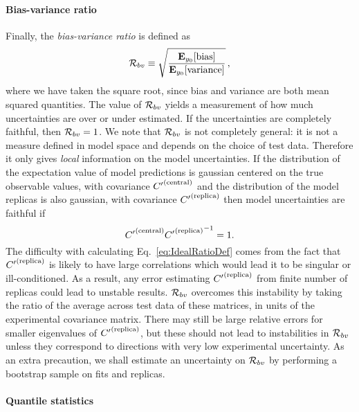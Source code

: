 \paragraph{Bias-variance ratio}

Finally, the {\em bias-variance ratio} is defined as
\begin{equation}
    \label{eq:RatioDef}
    \mathcal{R}_{bv} \equiv \sqrt{\frac{
        \mathbf{E}_{y_0}[ {\rm bias} ]}{
            \mathbf{E}_{y_0}[ {\rm variance} ]}}\, ,
\end{equation}
where we have taken the square root, since bias and variance are both mean
squared quantities. The value of $\mathcal{R}_{bv}$ yields a measurement of how
much uncertainties are over or under estimated. If the uncertainties are
completely faithful, then $\mathcal{R}_{bv} = 1$. We note that $\mathcal{R}_{bv}$ is
not completely general: it is not a measure defined in model space and depends
on the choice of test data. Therefore it only gives {\em local} information on
the model uncertainties. If the distribution of the expectation value of model
predictions is gaussian centered on the true observable values, with covariance
${{C}^{\prime}}^{(\rm central)}$ and the distribution of the model replicas is also gaussian, with
covariance ${{C}^{\prime}}^{(\rm replica)}$ then model uncertainties are faithful if
\begin{equation}\label{eq:IdealRatioDef}
    {{C}^{\prime}}^{(\rm central)} {{{C}^{\prime}}^{(\rm replica)}}^{-1} = 1.
\end{equation}
The difficulty with calculating Eq.~\ref{eq:IdealRatioDef} comes from the fact
that ${{C}^{\prime}}^{(\rm replica)}$ is likely to have large correlations which would lead it to be
singular or ill-conditioned. As a result, any error estimating ${{C}^{\prime}}^{(\rm replica)}$ from
finite number of replicas could lead to unstable results. $\mathcal{R}_{bv}$
overcomes this instability by taking the ratio of the average across test data
of these matrices, in units of the experimental covariance matrix. There may
still be large relative errors for smaller eigenvalues of ${{C}^{\prime}}^{(\rm replica)}$, but these
should not lead to instabilities in $\mathcal{R}_{bv}$ unless they correspond to
directions with very low experimental uncertainty. As an extra precaution, we
shall estimate an uncertainty on $\mathcal{R}_{bv}$ by performing a bootstrap
sample on fits and replicas.

\paragraph{Quantile statistics}
\label{sec:QuantileStatistics}


